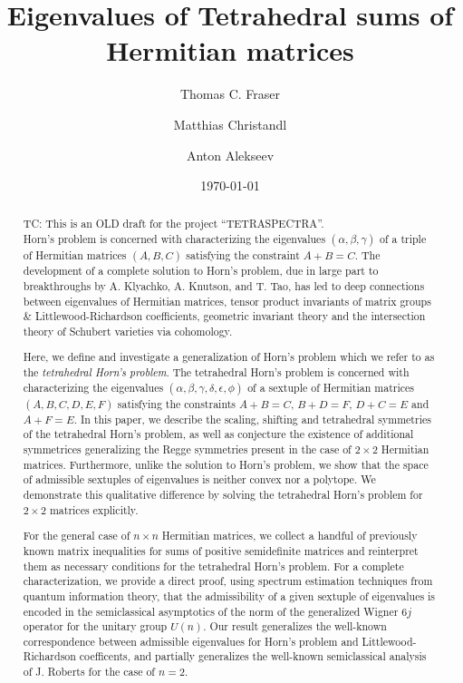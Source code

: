 \documentclass[notitlepage, 10pt]{article}
\author[1]{Thomas C. Fraser}
\author[1]{Matthias Christandl}
\author[2]{Anton Alekseev}
\affil[1]{\small{Department of Mathematical Sciences, University of Copenhagen, Universitetsparken 5, 2100 Denmark}}
\affil[2]{\small{Department of Mathematics, Universtiy of Geneva, 7-9 rue du Conseil Général, 1211 Geneva 4, Switzerland}}
\title{Eigenvalues of Tetrahedral sums of Hermitian matrices}
\date{\today}
\begin{document}
\maketitle

\begin{abstract}
    {\color{blue}
        TC: This is an OLD draft for the project ``TETRASPECTRA''. \\
    }
    Horn's problem is concerned with characterizing the eigenvalues $(\alpha,\beta,\gamma)$ of a triple of Hermitian matrices $(A,B,C)$ satisfying the constraint $A+B=C$.
    The development of a complete solution to Horn's problem, due in large part to breakthroughs by A. Klyachko, A. Knutson, and T. Tao, has led to deep connections between eigenvalues of Hermitian matrices, tensor product invariants of matrix groups \& Littlewood-Richardson coefficients, geometric invariant theory and the intersection theory of Schubert varieties via cohomology.
    
    Here, we define and investigate a generalization of Horn's problem which we refer to as the \textit{tetrahedral Horn's problem}.
    The tetrahedral Horn's problem is concerned with characterizing the eigenvalues $(\alpha,\beta,\gamma,\delta,\epsilon,\phi)$ of a sextuple of Hermitian matrices $(A,B,C,D,E,F)$ satisfying the constraints $A+B=C$, $B+D=F$, $D+C=E$ and $A+F=E$.
    In this paper, we describe the scaling, shifting and tetrahedral symmetries of the tetrahedral Horn's problem, as well as conjecture the existence of additional symmetrices generalizing the Regge symmetries present in the case of $2\times 2$ Hermitian matrices.
    Furthermore, unlike the solution to Horn's problem, we show that the space of admissible sextuples of eigenvalues is neither convex nor a polytope.
    We demonstrate this qualitative difference by solving the tetrahedral Horn's problem for $2\times 2$ matrices explicitly.

    For the general case of $n\times n$ Hermitian matrices, we collect a handful of previously known matrix inequalities for sums of positive semidefinite matrices and reinterpret them as necessary conditions for the tetrahedral Horn's problem.
    For a complete characterization, we provide a direct proof, using spectrum estimation techniques from quantum information theory, that the admissibility of a given sextuple of eigenvalues is encoded in the semiclassical asymptotics of the norm of the generalized Wigner $6j$ operator for the unitary group $U(n)$.
    Our result generalizes the well-known correspondence between admissible eigenvalues for Horn's problem and Littlewood-Richardson coefficents, and partially generalizes the well-known semiclassical analysis of J. Roberts for the case of $n=2$.
    

\end{abstract}
\end{document}
